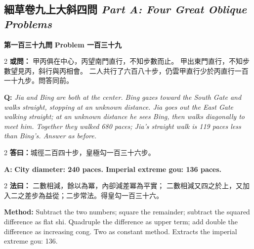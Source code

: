 \documentclass[11pt,a4paper]{article}
\newcommand{\wen}[1]{%
  \par\vspace{0.5em}%
  \noindent\textcolor{problemcolor}{\textbf{第#1問}}%
  \hfill\textcolor{problemcolor}{\textbf{Problem #1}}\par\nopagebreak%
  \vspace{0.3em}%
}
\newcommand{\owen}[1]{%
  \noindent\textcolor{problemcolor}{\textbf{或問：}}{\tradfont #1}\par\nopagebreak%
}
\newcommand{\oweneng}[1]{%
  \noindent\textcolor{engcolor}{\textbf{Q: }}{\itshape #1}\par\nopagebreak%
}
\newcommand{\fayue}[1]{%
  \noindent\textcolor{methodcolor}{\textbf{法曰：}}{\tradfont #1}\par\nopagebreak%
}
\newcommand{\fayueeng}[1]{%
  \noindent\textcolor{engcolor}{\textbf{Method: }}{#1}\par\nopagebreak%
}
\newcommand{\dayue}[1]{%
  \noindent\textcolor{anscolor}{\textbf{答曰：}}{\tradfont #1}\par\nopagebreak%
}
\newcommand{\dayueeng}[1]{%
  \noindent\textcolor{engcolor}{\textbf{A: }}{\bfseries #1}\par\nopagebreak%
}
\newcommand{\bilingsubsec}[2]{%
  \subsection{\tradfont #1 \hfill\normalfont\normalsize\textit{#2}}%
}
\begin{document}
\vspace{0.5cm}

\bilingsubsec{細草卷九上\quad 大斜四問}{Part A: Four Great Oblique Problems}

\vspace{0.3cm}

\wen{一百三十九}

\begin{paracol}{2}
\owen{%
甲丙俱在中心，丙望南門直行，不知步數而止。
甲出東門直行，不知步數望見丙，斜行與丙相會。
二人共行了六百八十步，仍雲甲直行少於丙直行一百一十九步。問答同前。}
\switchcolumn
\oweneng{%
Jia and Bing are both at the center. Bing gazes toward the South Gate and walks straight, stopping at an unknown distance. Jia goes out the East Gate walking straight; at an unknown distance he sees Bing, then walks diagonally to meet him. Together they walked 680 paces; Jia's straight walk is 119 paces less than Bing's. Answer as before.}
\end{paracol}

\begin{paracol}{2}
\dayue{城徑二百四十步，皇極勾一百三十六步。}
\switchcolumn
\dayueeng{City diameter: 240 paces. Imperial extreme gou: 136 paces.}
\end{paracol}

\begin{paracol}{2}
\fayue{%
二數相減，餘以為冪，內卻減差冪為平實；
二數相減又四之於上，又加入二之差步為益從；二步常法。得皇勾一百三十六。}
\switchcolumn
\fayueeng{%
Subtract the two numbers; square the remainder; subtract the squared difference as flat shi. Quadruple the difference as upper term; add double the difference as increasing cong. Two as constant method. Extracts the imperial extreme gou: 136.}
\end{paracol}
\end{document}
